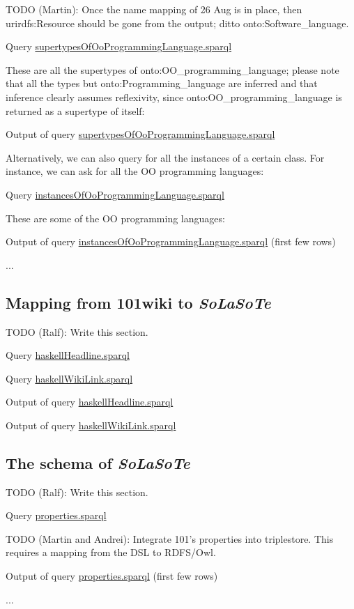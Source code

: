 \documentclass{article}
\newcommand{\uri}[1]{\textsf{#1}}
\newcommand{\ooo}[1]{\textsf{101#1}}%
\newcommand{\todo}[2]{\noindent{}TODO (#1): #2}
\newcommand{\solasote}{{\itshape\textsf{SoLaSoTe}}}
\newcommand{\sparql}[1]{%
\medskip

\noindent
\begin{boxedminipage}{\hsize}
\hfill{}Query \underline{#1.sparql}

\end{boxedminipage}
\medskip
}
\newcommand{\partialOutput}[2]{%

\medskip

\noindent
\begin{boxedminipage}{\hsize}
\hfill{}Output of query \underline{#2.sparql} (first few rows)

{\large{}...}
\end{boxedminipage}
\medskip
}
\newcommand{\completeOutput}[1]{%

\medskip

\noindent
\begin{boxedminipage}{\hsize}
\hfill{}Output of query \underline{#1.sparql}

\end{boxedminipage}
\medskip
}
\begin{document}
\todo{Martin}{Once the name mapping of 26 Aug is in place, then
  uri{rdfs:Resource} should be gone from the output; ditto \uri{onto:Software\_language}.}

\sparql{supertypesOfOoProgrammingLanguage}

\noindent
These are all the supertypes of \uri{onto:OO\_programming\_language};
please note that all the types but \uri{onto:Programming\_language}
are inferred and that inference clearly assumes reflexivity, since
\uri{onto:OO\_programming\_language} is returned as a supertype of itself:

\completeOutput{supertypesOfOoProgrammingLanguage}

\noindent
Alternatively, we can also query for all the instances of a certain
class. For instance, we can ask for all the OO programming languages:

\sparql{instancesOfOoProgrammingLanguage}

\noindent
These are some of the OO programming languages:

\partialOutput{7}{instancesOfOoProgrammingLanguage}


\subsection{Mapping from \ooo{wiki} to \solasote}
\label{S:mapping}

\todo{Ralf}{Write this section.}

\sparql{haskellHeadline}

\sparql{haskellWikiLink}

\completeOutput{haskellHeadline}

\completeOutput{haskellWikiLink}


\subsection{The schema of \solasote}

\todo{Ralf}{Write this section.}

\sparql{properties}

\todo{Martin and Andrei}{Integrate 101's properties into
  triplestore. This requires a mapping from the DSL to RDFS/Owl.}

\partialOutput{7}{properties}

\end{document}
